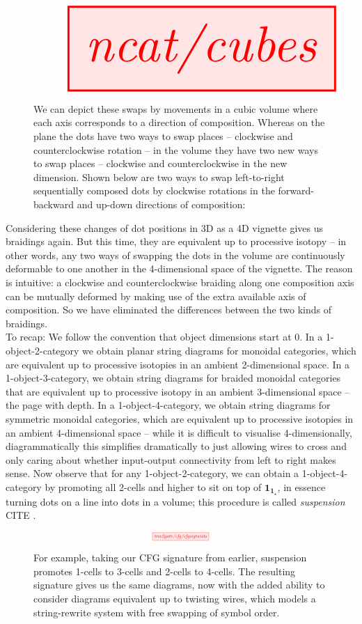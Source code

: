 \begin{figure}[h!]
\centering
\[\resizebox{\textwidth}{!}{\tikzfig{ncat/cubes}}\]
\caption{We can depict these swaps by movements in a cubic volume where each axis corresponds to a direction of composition. Whereas on the plane the dots have two ways to swap places -- clockwise and counterclockwise rotation -- in the volume they have two new ways to swap places -- clockwise and counterclockwise in the new dimension. Shown below are two ways to swap left-to-right sequentially composed dots by clockwise rotations in the forward-backward and up-down directions of composition:}
\end{figure}

Considering these changes of dot positions in 3D as a 4D vignette gives us braidings again. But this time, they are equivalent up to processive isotopy -- in other words, any two ways of swapping the dots in the volume are continuously deformable to one another in the 4-dimensional space of the vignette. The reason is intuitive: a clockwise and counterclockwise braiding along one composition axis can be mutually deformed by making use of the extra available axis of composition. So we have eliminated the differences between the two kinds of braidings.\\

To recap: We follow the convention that object dimensions start at 0. In a 1-object-2-category we obtain planar string diagrams for monoidal categories, which are equivalent up to processive isotopies in an ambient 2-dimensional space. In a 1-object-3-category, we obtain string diagrams for braided monoidal categories that are equivalent up to processive isotopy in an ambient 3-dimensional space -- the page with depth. In a 1-object-4-category, we obtain string diagrams for symmetric monoidal categories, which are equivalent up to processive isotopies in an ambient 4-dimensional space -- while it is difficult to visualise 4-dimensionally, diagrammatically this simplifies dramatically to just allowing wires to cross and only caring about whether input-output connectivity from left to right makes sense. Now observe that for any 1-object-2-category, we can obtain a 1-object-4-category by promoting all 2-cells and higher to sit on top of $\textbf{1}_{\textbf{1}_\star}$, in essence turning dots on a line into dots in a volume; this procedure is called \emph{suspension} \bR CITE \e.

\begin{figure}[h!]
\centering
\[\scalebox{0.5}{\tikzfig{tree2gate/cfg/cfgsigtwists}}\]
\caption{For example, taking our CFG signature from earlier, suspension promotes 1-cells to 3-cells and 2-cells to 4-cells. The resulting signature gives us the same diagrams, now with the added ability to consider diagrams equivalent up to twisting wires, which models a string-rewrite system with free swapping of symbol order.}
\end{figure}

